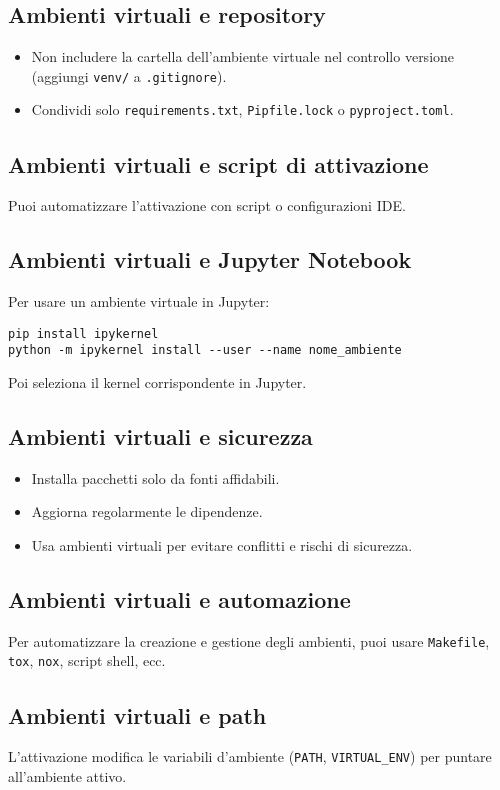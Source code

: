 \documentclass[a4paper,12pt]{article}
\begin{document}
\subsection*{Ambienti virtuali e repository}
\begin{itemize}
    \item Non includere la cartella dell'ambiente virtuale nel controllo versione (aggiungi \texttt{venv/} a \texttt{.gitignore}).
    \item Condividi solo \texttt{requirements.txt}, \texttt{Pipfile.lock} o \texttt{pyproject.toml}.
\end{itemize}

\subsection*{Ambienti virtuali e script di attivazione}
Puoi automatizzare l'attivazione con script o configurazioni IDE.

\subsection*{Ambienti virtuali e Jupyter Notebook}
Per usare un ambiente virtuale in Jupyter:
\begin{lstlisting}
pip install ipykernel
python -m ipykernel install --user --name nome_ambiente
\end{lstlisting}
Poi seleziona il kernel corrispondente in Jupyter.

\subsection*{Ambienti virtuali e sicurezza}
\begin{itemize}
    \item Installa pacchetti solo da fonti affidabili.
    \item Aggiorna regolarmente le dipendenze.
    \item Usa ambienti virtuali per evitare conflitti e rischi di sicurezza.
\end{itemize}

\subsection*{Ambienti virtuali e automazione}
Per automatizzare la creazione e gestione degli ambienti, puoi usare \texttt{Makefile}, \texttt{tox}, \texttt{nox}, script shell, ecc.

\subsection*{Ambienti virtuali e path}
L'attivazione modifica le variabili d'ambiente (\texttt{PATH}, \texttt{VIRTUAL\_ENV}) per puntare all'ambiente attivo.
\end{document}
